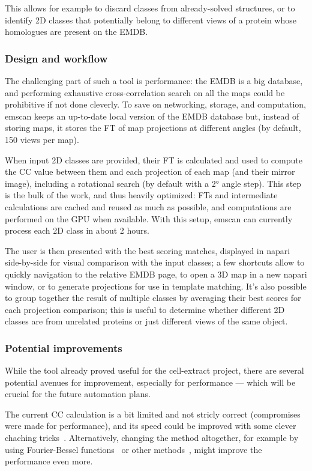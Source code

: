 This allows for example to discard classes from already-solved structures, or to identify 2D classes that potentially belong to different views of a protein whose homologues are present on the EMDB.

\subsubsection{Design and workflow}

The challenging part of such a tool is performance: the EMDB is a big database, and performing exhaustive cross-correlation search on all the maps could be prohibitive if not done cleverly.
To save on networking, storage, and computation, emscan keeps an up-to-date local version of the EMDB database but, instead of storing maps, it stores the FT of map projections at different angles (by default, 150 views per map).

When input 2D classes are provided, their FT is calculated and used to compute the CC value between them and each projection of each map (and their mirror image), including a rotational search (by default with a 2° angle step).
This step is the bulk of the work, and thus heavily optimized: FTs and intermediate calculations are cached and reused as much as possible, and computations are performed on the GPU when available.
With this setup, emscan can currently process each 2D class in about 2 hours.

The user is then presented with the best scoring matches, displayed in napari side-by-side for visual comparison with the input classes; a few shortcuts allow to quickly navigation to the relative EMDB page, to open a 3D map in a new napari window, or to generate projections for use in template matching.
It's also possible to group together the result of multiple classes by averaging their best scores for each projection comparison; this is useful to determine whether different 2D classes are from unrelated proteins or just different views of the same object.

\subsubsection{Potential improvements}

While the tool already proved useful for the cell-extract project, there are several potential avenues for improvement, especially for performance --- which will be crucial for the future automation plans.

The current CC calculation is a bit limited and not stricly correct (compromises were made for performance), and its speed could be improved with some clever chaching tricks~\cite{kasoComputationNormalizedCrosscorrelation2018}.
Alternatively, changing the method altogether, for example by using Fourier-Bessel functions~\cite{zhaoFourierBesselRotational2013} or other methods~\cite{almiraFastNormalizedCrosscorrelation2024}, might improve the performance even more.

